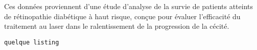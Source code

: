 \documentclass[../main.tex]{subfiles}
\begin{document}
\begin{CJK*}{UTF8}{gbsn}
Ces données proviennent d'une étude d'analyse de la survie de patients atteints de rétinopathie diabétique à haut risque, conçue pour évaluer l'efficacité du traitement au laser dans le ralentissement de la progression de la cécité.

\begin{lstlisting}
quelque listing

\end{lstlisting}

\end{CJK*}
\end{document}
